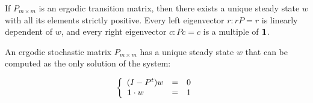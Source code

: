 \begin{frame}
\begin{columns}
\begin{column}{0.5\textwidth}
\begin{theorem}
        If \(P_{m\times m}\) is an ergodic transition matrix, then there exists 
        a unique steady state \(w\) with all its elements strictly positive. Every left
        eigenvector \(r: rP = r\) is linearly dependent of \(w\), and
        every right eigenvector \(c: Pc = c\) is a multiple of \(\mathbf{1}\).

        \label{th:steady-ergodic}
        \end{theorem}

        \begin{lemma}
        An ergodic stochastic matrix \(P_{m \times m}\) has a unique steady state \(w\) 
        that can be computed as the only solution of the system:

        \[
        \left\{\begin{array}{lcl} (I - P^t)w & = & 0 \\ \mathbf{1} \cdot w & = & 1 \end{array}\right.
        \]
        \label{lemma:steady-states-computation}
        \end{lemma}
    \end{column}
    \end{columns}
 \end{frame}
